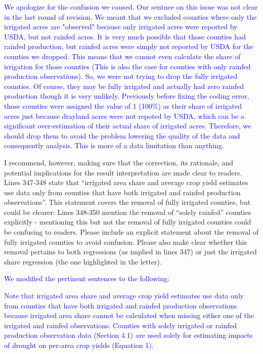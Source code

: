 \documentclass[
]{article}
\begin{document}
\textcolor{blue}{We apologize for the confusion we caused. Our sentnce on this issue was not clear in the last round of revision. We meant that we excluded counties where only the irrigated acres are "observed" because only irrigated acres were reported by USDA, but not rainfed acres. It is very much possible that those counties had rainfed production, but rainfed acres were simply not reported by USDA for the counties we dropped. This means that we cannot even calculate the share of irrigation for those counties (This is also the case for counties with only rainfed production observations). So, we were not trying to drop the fully irrigated counties. Of course, they may be fully irrigated and actually had zero rainfed production though it is very unlikely. Previously before fixing the coding error, those counties were assigned the value of 1 (100\%) as their share of irrigated acres just because drayland acres were not repoted by USDA, which can be a significant over-estimation of their actual share of irrigated acres. Therefore, we should drop them to avoid the problem lowering the quality of the data and consequently analysis. This is more of a data limitation than anything.}

I recommend, however, making sure that the correction, its rationale,
and potential implications for the result interpretation are made clear
to readers. Lines 347-348 state that ``irrigated area share and average
crop yield estimates use data only from counties that have both
irrigated and rainfed production observations''. This statement covers
the removal of fully irrigated counties, but could be clearer: Lines
348-350 mention the removal of ``solely rainfed'' counties explicitly -
mentioning this but not the removal of fully irrigated counties could be
confusing to readers. Please include an explicit statement about the
removal of fully irrigated counties to avoid confusion. Please also make
clear whether this removal pertains to both regressions (as implied in
lines 347) or just the irrigated share regression (the one highlighted
in the letter).

\textcolor{blue}{We modified the pertinent sentences to the following:}

\textcolor{blue}{Note that irrigated area share and average crop yield estimates use data only from counties that have both irrigated and rainfed production observations because irrigated area share cannot be calculated when missing either one of the irrigated and rainfed observations. Counties with solely irrigated or rainfed production observation data (Section 4.1) are used solely for estimating impacts of drought on per-area crop yields (Equation 1).}
\end{document}
